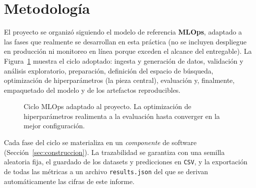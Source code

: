 \documentclass[11pt,a4paper,twocolumn]{article}
\begin{document}
\section{Metodología}
El proyecto se organizó siguiendo el modelo de referencia \textbf{MLOps}, adaptado a las fases que
realmente se desarrollan en esta práctica (no se incluyen despliegue en producción ni monitoreo en línea
porque exceden el alcance del entregable). La Figura~\ref{fig:mlops} muestra el ciclo adoptado: ingesta y
generación de datos, validación y análisis exploratorio, preparación, definición del espacio de búsqueda,
optimización de hiperparámetros (la pieza central), evaluación y, finalmente, empaquetado del modelo y de
los artefactos reproducibles.

\begin{figure}[H]
\centering
{}
\caption{Ciclo MLOps adaptado al proyecto. La optimización de hiperparámetros realimenta a la evaluación
hasta converger en la mejor configuración.}
\label{fig:mlops}
\end{figure}

Cada fase del ciclo se materializa en un \emph{componente} de software (Sección~\ref{sec:construccion}). La
trazabilidad se garantiza con una semilla aleatoria fija, el guardado de los datasets y predicciones en
\texttt{CSV}, y la exportación de todas las métricas a un archivo \texttt{results.json} del que se derivan
automáticamente las cifras de este informe.
\end{document}
